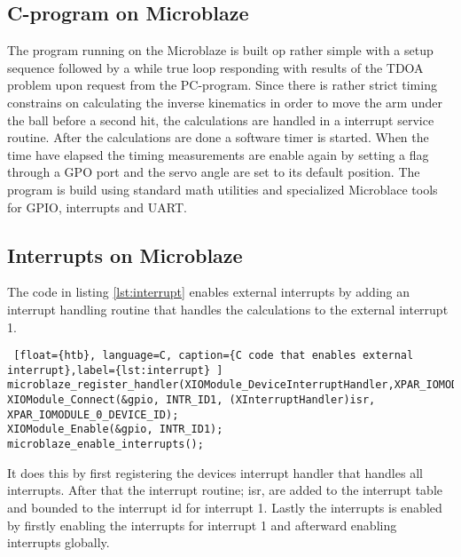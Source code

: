 \subsection{C-program on Microblaze}
The program running on the Microblaze is built op rather simple with a setup sequence followed by a while true loop responding with results of the TDOA problem upon request from the PC-program. Since there is rather strict timing constrains on calculating the inverse kinematics in order to move the arm under the ball before a second hit, the calculations are handled in a interrupt service routine. After the calculations are done a software timer is started. When the time have elapsed the timing measurements are enable again by setting a flag through a GPO port and the servo angle are set to its default position. The program is build using standard math utilities and specialized Microblace tools for GPIO, interrupts and UART.
%
\subsection{Interrupts on Microblaze}
The code in listing \ref{lst:interrupt} enables external interrupts by adding an interrupt handling routine that handles the calculations to the external interrupt 1.
%
\begin{lstlisting} [float={htb}, language=C, caption={C code that enables external interrupt},label={lst:interrupt} ]
microblaze_register_handler(XIOModule_DeviceInterruptHandler,XPAR_IOMODULE_0_DEVICE_ID);
XIOModule_Connect(&gpio, INTR_ID1, (XInterruptHandler)isr, XPAR_IOMODULE_0_DEVICE_ID);
XIOModule_Enable(&gpio, INTR_ID1);
microblaze_enable_interrupts();
\end{lstlisting}
It does this by first registering the devices interrupt handler that handles all interrupts. After that the interrupt routine; isr, are added to the interrupt table and bounded to the interrupt id for interrupt 1. Lastly the interrupts is enabled by firstly enabling the interrupts for interrupt 1 and afterward enabling interrupts globally.
%
